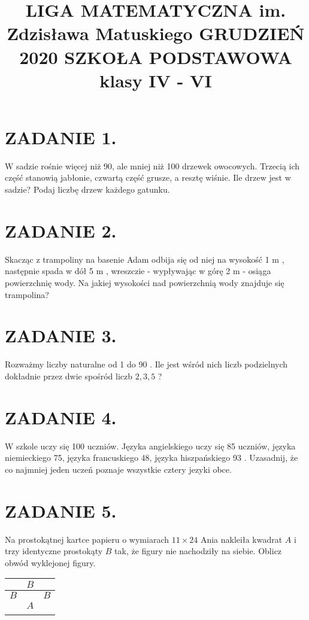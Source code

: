 \documentclass[10pt]{article}
\title{LIGA MATEMATYCZNA im. Zdzisława Matuskiego GRUDZIEŃ 2020 SZKOŁA PODSTAWOWA \\
 klasy IV - VI }
\author{}
\date{}
\begin{document}
\maketitle
\section*{ZADANIE 1.}
W sadzie rośnie więcej niż 90, ale mniej niż 100 drzewek owocowych. Trzecią ich część stanowią jabłonie, czwartą część grusze, a resztę wiśnie. Ile drzew jest w sadzie? Podaj liczbę drzew każdego gatunku.

\section*{ZADANIE 2.}
Skacząc z trampoliny na basenie Adam odbija się od niej na wysokość 1 m , następnie spada w dół 5 m , wreszczie - wypływając w górę 2 m - osiąga powierzchnię wody. Na jakiej wysokości nad powierzchnią wody znajduje się trampolina?

\section*{ZADANIE 3.}
Rozważmy liczby naturalne od 1 do 90 . Ile jest wśród nich liczb podzielnych dokładnie przez dwie spośród liczb \(2,3,5\) ?

\section*{ZADANIE 4.}
W szkole uczy się 100 uczniów. Języka angielskiego uczy się 85 uczniów, języka niemieckiego 75, języka francuskiego 48, języka hiszpańskiego 93 . Uzasadnij, że co najmniej jeden uczeń poznaje wszystkie cztery jezyki obce.

\section*{ZADANIE 5.}
Na prostokątnej kartce papieru o wymiarach \(11 \times 24\) Ania nakleiła kwadrat \(A\) i trzy identyczne prostokąty \(B\) tak, że figury nie nachodziły na siebie. Oblicz obwód wyklejonej figury.

\begin{center}
\begin{tabular}{|l|l|l|}
\hline
 & \(B\) &  \\
\hline
\(B\) &  & \(B\) \\
 & \(A\) &  \\
\cline { 3 - 3 }
 &  &  \\
\hline
\end{tabular}
\end{center}
\end{document}
